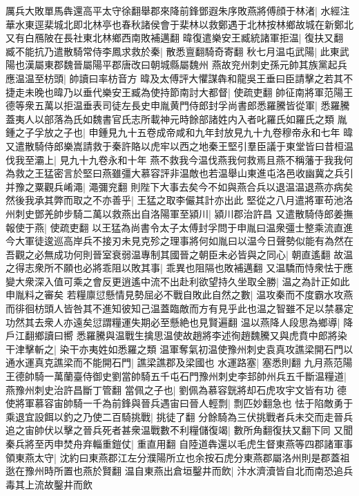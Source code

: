 厲兵大敗單馬犇還高平太守徐翻舉郡來降前鋒鄧遐朱序敗燕將傅顔于林渚|{
	水經注華水東逕棐城北即北林亭也春秋諸侯會于棐林以救鄭遇于北林按林鄉故城在新鄭北又有白鴈陂在長社東北林鄉西南敗補邁翻}
暐復遣樂安王臧統諸軍拒温|{
	復扶又翻}
臧不能抗乃遣散騎常侍李鳳求救於秦|{
	散悉亶翻騎奇寄翻}
秋七月温屯武陽|{
	此東武陽也漢屬東郡魏晉屬陽平郡唐改曰朝城縣屬魏州}
燕故兖州刺史孫元帥其族黨起兵應温温至枋頭|{
	帥讀曰率枋音方}
暐及太傅評大懼謀犇和龍吳王垂曰臣請擊之若其不捷走未晚也暐乃以垂代樂安王臧為使持節南討大都督|{
	使疏吏翻}
帥征南將軍范陽王德等衆五萬以拒温垂表司徒左長史申胤黄門侍郎封孚尚書郎悉羅騰皆從軍|{
	悉羅騰蓋夷人以部落為氏如魏書官氏志所載神元時餘部諸姓内入者叱羅氏如羅氏之類}
胤鍾之子孚放之子也|{
	申鍾見九十五卷成帝咸和九年封放見九十九卷穆帝永和七年}
暐又遣散騎侍郎樂嵩請救于秦許賂以虎牢以西之地秦王堅引羣臣議于東堂皆曰昔桓温伐我至灞上|{
	見九十九卷永和十年}
燕不救我今温伐燕我何救焉且燕不稱藩于我我何為救之王猛密言於堅曰燕雖彊大慕容評非温敵也若温舉山東進屯洛邑收幽冀之兵引并豫之粟觀兵崤澠|{
	澠彌兖翻}
則陛下大事去矣今不如與燕合兵以退温温退燕亦病矣然後我承其弊而取之不亦善乎|{
	王猛之取李儼其計亦出此}
堅從之八月遣將軍苟池洛州刺史鄧羌帥步騎二萬以救燕出自洛陽軍至潁川|{
	潁川郡治許昌}
又遣散騎侍郎姜撫報使于燕|{
	使疏吏翻}
以王猛為尚書令太子太傅封孚問于申胤曰温衆彊士整乘流直進今大軍徒逡巡高岸兵不接刃未見克殄之理事將何如胤曰以温今日聲勢似能有為然在吾觀之必無成功何則晉室衰弱温專制其國晉之朝臣未必皆與之同心|{
	朝直遙翻}
故温之得志衆所不願也必將乖阻以敗其事|{
	乖異也阻隔也敗補邁翻}
又温驕而恃衆怯于應變大衆深入值可乘之會反更逍遙中流不出赴利欲望持久坐取全勝|{
	温之為計正如此申胤料之審矣}
若糧廪愆懸情見勢屈必不戰自敗此自然之數|{
	温攻秦而不度霸水攻燕而徘徊枋頭人皆咎其不進知彼知己温蓋臨敵而方有見乎此也温之智雖不足以禁暴定功然其去衆人亦遠矣愆謂糧運失期必至懸絶也見賢遍翻}
温以燕降人段思為鄉導|{
	降戶江翻鄉讀曰嚮}
悉羅騰與温戰生擒思温使故趙將李述徇趙魏騰又與虎賁中郎將染干津擊斬之|{
	染干亦夷姓如悉羅之類}
温軍奪氣初温使豫州刺史袁真攻譙梁開石門以通水運真克譙梁而不能開石門|{
	譙梁譙郡及梁國也}
水運路塞|{
	塞悉則翻}
九月燕范陽王德帥騎一萬蘭臺侍御史劉當帥騎五千屯石門豫州刺史李邽帥州兵五千斷温糧道|{
	燕豫州刺史治許昌斷丁管翻}
當佩之子也|{
	劉佩為慕容皝將却石虎攻宇文皆有功}
德使將軍慕容宙帥騎一千為前鋒與晉兵遇宙曰晉人輕剽|{
	剽匹妙翻急也}
怯于陷敵勇于乘退宜設餌以釣之乃使二百騎挑戰|{
	挑徒了翻}
分餘騎為三伏挑戰者兵未交而走晉兵追之宙帥伏以擊之晉兵死者甚衆温戰數不利糧儲復竭|{
	數所角翻復扶又翻下同}
又聞秦兵將至丙申焚舟弃輜重鎧仗|{
	重直用翻}
自陸道犇還以毛虎生督東燕等四郡諸軍事領東燕太守|{
	沈約曰東燕郡江左分濮陽所立也余按石虎分東燕郡屬洛州則是郡蓋祖逖在豫州時所置也燕於賢翻}
温自東燕出倉垣鑿井而飲|{
	汴水濟瀆皆自北而南恐追兵毒其上流故鑿井而飲}
